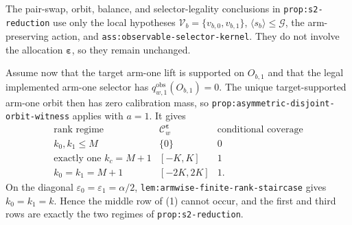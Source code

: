 The pair-swap, orbit, balance, and selector-legality conclusions in \texttt{prop:s2-reduction} use only the local hypotheses \(\mathcal V_b=\{v_{b,0},v_{b,1}\}\), \(\langle s_b\rangle\le\mathcal G\), the arm-preserving action, and \texttt{ass:observable-selector-kernel}. They do not involve the allocation \(\boldsymbol\varepsilon\), so they remain unchanged.

Assume now that the target arm-one lift is supported on \(O_{b,1}\) and that the legal implemented arm-one selector has \(q^{\mathrm{obs}}_{w,1}(O_{b,1})=0\). The unique target-supported arm-one orbit then has zero calibration mass, so \texttt{prop:asymmetric-disjoint-orbit-witness} applies with \(a=1\). It gives
\[
\begin{array}{c|c|c}
\text{rank regime}&\mathcal C^{\boldsymbol\varepsilon}_w&\text{conditional coverage}\\ \hline
k_0,k_1\le M&\{0\}&0\\
\text{exactly one }k_c=M+1&[-K,K]&1\\
k_0=k_1=M+1&[-2K,2K]&1.
\end{array}
\tag{1}
\]
On the diagonal \(\varepsilon_0=\varepsilon_1=\alpha/2\), \texttt{lem:armwise-finite-rank-staircase} gives \(k_0=k_1=k\). Hence the middle row of (1) cannot occur, and the first and third rows are exactly the two regimes of \texttt{prop:s2-reduction}.